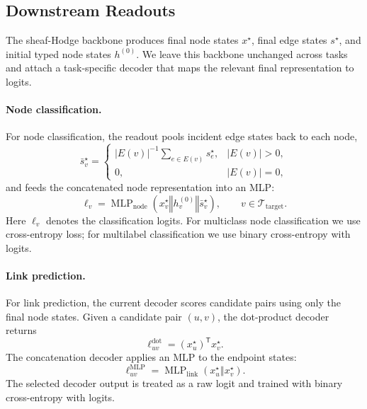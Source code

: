 \documentclass[sigconf,anonymous,review]{acmart}
\newcommand{\transpose}{\mathsf{T}}
\newcommand{\concat}{\mathbin\Vert}
\begin{document}
\subsection{Downstream Readouts}
\label{sec:readouts}

The sheaf-Hodge backbone produces final node states \(x^\star\), final edge states
\(s^\star\), and initial typed node states \(h^{(0)}\).  We leave this backbone unchanged across
tasks and attach a task-specific decoder that maps the relevant final representation to logits.

\paragraph{Node classification.}
For node classification, the readout pools incident edge states back to each node,
\begin{equation}
  \bar s_v^\star
  =
  \begin{cases}
    |E(v)|^{-1}\sum_{e\in E(v)}s_e^\star, & |E(v)|>0,\\
    0, & |E(v)|=0 ,
  \end{cases}
  \label{eq:node-edge-summary}
\end{equation}
and feeds the concatenated node representation into an MLP:
\begin{equation}
  \ell_v
  =
  \operatorname{MLP}_{\mathrm{node}}
  \left(
    x_v^\star\concat h_v^{(0)}\concat\bar s_v^\star
  \right),
  \qquad v\in\mathcal{T}_{\mathrm{target}} .
  \label{eq:node-readout}
\end{equation}
Here \(\ell_v\) denotes the classification logits.  For multiclass node classification we use
cross-entropy loss; for multilabel classification we use binary cross-entropy with logits.

\paragraph{Link prediction.}
For link prediction, the current decoder scores candidate pairs using only the final node states.
Given a candidate pair \((u,v)\), the dot-product decoder returns
\begin{equation}
  \ell_{uv}^{\mathrm{dot}}
  =
  (x_u^\star)^{\transpose}x_v^\star .
  \label{eq:link-dot}
\end{equation}
The concatenation decoder applies an MLP to the endpoint states:
\begin{equation}
  \ell_{uv}^{\mathrm{MLP}}
  =
  \operatorname{MLP}_{\mathrm{link}}
  \left(x_u^\star\concat x_v^\star\right).
  \label{eq:link-mlp}
\end{equation}
The selected decoder output is treated as a raw logit and trained with binary cross-entropy with
logits.
\end{document}
